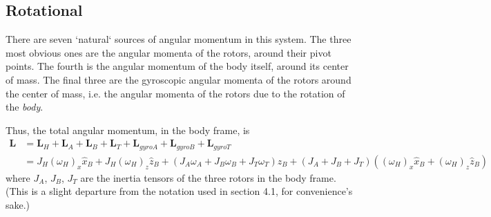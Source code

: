 \documentclass[10pt,letterpaper,final]{article}
\begin{document}
\subsection{Rotational}
There are seven `natural` sources of angular momentum in this system. The three most obvious ones are the angular momenta of the rotors, around their pivot points. The fourth is the angular momentum of the body itself, around its center of mass. The final three are the gyroscopic angular momenta of the rotors around the center of mass, i.e. the angular momenta of the rotors due to the rotation of the \textit{body}.

Thus, the total angular momentum, in the body frame, is
\begin{align*}
\bm L &= \bm L_H + \bm L_A + \bm L_B + \bm L_T + \bm L_{gyro A} + \bm L_{gyro B} + \bm L_{gyro T} \\
&= J_H (\omega_H)_x \hat{x}_B + J_H (\omega_H)_z \hat{z}_B +  (J_A \omega_A + J_B \omega_B + J_T \omega_T) \hat{z}_B + (J_A + J_B + J_T) ((\omega_H)_x \hat{x}_B + (\omega_H)_z \hat{z}_B)
\end{align*}
where $J_A$, $J_B$, $J_T$ are the inertia tensors of the three rotors in the body frame. (This is a slight departure from the notation used in section 4.1, for convenience's sake.)
\end{document}
